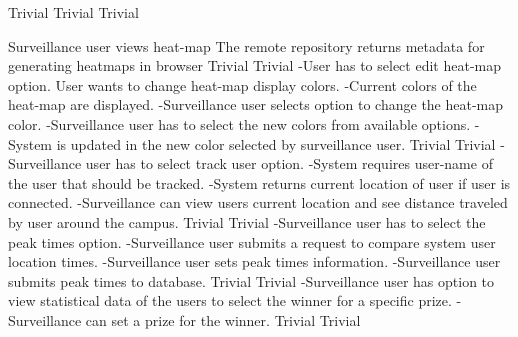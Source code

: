  		{Trivial}
    {Trivial}
    {Trivial}

\FuncReq
    {Surveillance user views heat-map}
		{The remote repository returns metadata for generating heatmaps in browser}
    {Trivial}
    {Trivial}
		{-User has to select edit heat-map option.
		 {User wants to change heat-map display colors.}
		{-Current colors of the heat-map are displayed.
		-Surveillance user selects option to change the heat-map color.
		-Surveillance user has to select the new colors from available options.
		-System is updated in the new color selected by surveillance user.}	
		}
    {Trivial}
    {Trivial}	
		{-Surveillance user has to select track user option.
		-System requires user-name of the user that should be tracked.
		-System returns current location of user if user is connected.
		-Surveillance can view users current location and see distance traveled by user around the campus.}
    {Trivial}
    {Trivial}
		{-Surveillance user has to select the peak times option.
		-Surveillance user submits a request to compare system user location times.
		-Surveillance user sets peak times information.
		-Surveillance user submits peak times to database.}
    {Trivial}
    {Trivial}
		{-Surveillance user has option to view statistical data of the users to select the winner for a specific prize.
		 -Surveillance can set a prize for the winner.}
    {Trivial}
    {Trivial}
